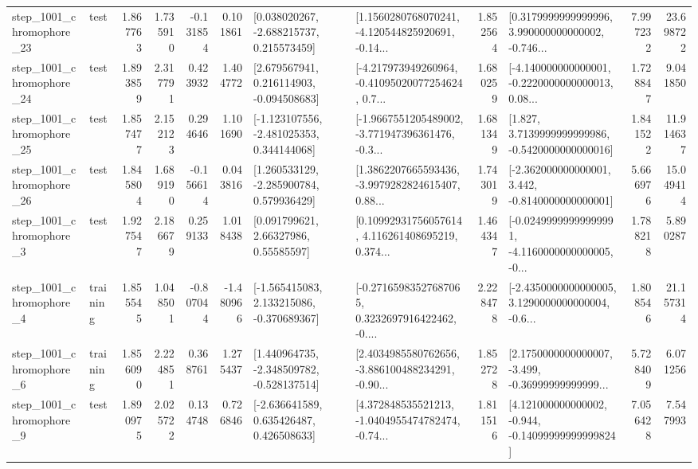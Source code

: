 \begin{tabular}{llrrrrllrlrr}
 step\_1001\_chromophore\_23 &      test &      1.867763 &    1.735910 &     -0.131854 &  0.101861 &    [0.038020267, -2.688215737, 0.215573459] &  [1.1560280768070241, -4.120544825920691, -0.14... &       1.852564 &  [0.3179999999999996, 3.990000000000002, -0.746... &            7.997232 &         23.698722 \\
 step\_1001\_chromophore\_24 &      test &      1.893859 &    2.317791 &      0.423932 &  1.404772 &    [2.679567941, 0.216114903, -0.094508683] &  [-4.217973949260964, -0.41095020077254624, 0.7... &       1.680259 &  [-4.140000000000001, -0.2220000000000013, 0.08... &            1.728847 &          9.041850 \\
 step\_1001\_chromophore\_25 &      test &      1.857477 &    2.152123 &      0.294646 &  1.101690 &   [-1.123107556, -2.481025353, 0.344144068] &  [-1.9667551205489002, -3.771947396361476, -0.3... &       1.681349 &   [1.827, 3.7139999999999986, -0.5420000000000016] &            1.841522 &         11.914637 \\
 step\_1001\_chromophore\_26 &      test &      1.845804 &    1.689190 &     -0.156614 &  0.043816 &    [1.260533129, -2.285900784, 0.579936429] &  [1.3862207665593436, -3.9979282824615407, 0.88... &       1.743019 &   [-2.362000000000001, 3.442, -0.8140000000000001] &            5.666976 &         15.049414 \\
  step\_1001\_chromophore\_3 &      test &      1.927547 &    2.186679 &      0.259133 &  1.018438 &       [0.091799621, 2.66327986, 0.55585597] &  [0.10992931756057614, 4.116261408695219, 0.374... &       1.464347 &  [-0.02499999999999991, -4.1160000000000005, -0... &            1.788218 &          5.890287 \\
  step\_1001\_chromophore\_4 &  training &      1.855545 &    1.048501 &     -0.807044 & -1.480966 &   [-1.565415083, 2.133215086, -0.370689367] &  [-0.27165983527687065, 0.3232697916422462, -0.... &       2.228478 &  [-2.4350000000000005, 3.1290000000000004, -0.6... &            1.808546 &         21.157314 \\
  step\_1001\_chromophore\_6 &  training &      1.856090 &    2.224851 &      0.368761 &  1.275437 &   [1.440964735, -2.348509782, -0.528137514] &  [2.4034985580762656, -3.886100488234291, -0.90... &       1.852728 &  [2.1750000000000007, -3.499, -0.36999999999999... &            5.728409 &          6.071256 \\
  step\_1001\_chromophore\_9 &      test &      1.890975 &    2.025722 &      0.134748 &  0.726846 &    [-2.636641589, 0.635426487, 0.426508633] &  [4.372848535521213, -1.0404955474782474, -0.74... &       1.811516 &  [4.121000000000002, -0.944, -0.14099999999999824] &            7.056428 &          7.547993 \\

\end{tabular}
